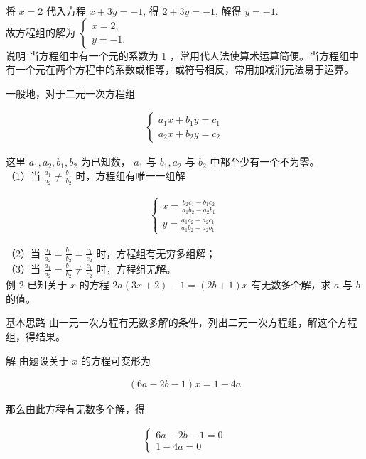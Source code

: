 \documentclass[10pt]{article}
\begin{document}
将 $x=2$ 代入方程 $x+3 y=-1$, 得 $2+3 y=-1$, 解得 $y=-1$.\\
故方程组的解为 $\left\{\begin{array}{l}x=2, \\ y=-1 .\end{array}\right.$\\
说明 当方程组中有一个元的系数为 1 ，常用代人法使算术运算简便。当方程组中有一个元在两个方程中的系数或相等，或符号相反，常用加减消元法易于运算。

一般地，对于二元一次方程组

\begin{align*}
\left\{\begin{array}{l}
a_{1} x+b_{1} y=c_{1} \\
a_{2} x+b_{2} y=c_{2}
\end{array}\right.
\end{align*}

这里 $a_{1}, a_{2}, b_{1}, b_{2}$ 为已知数， $a_{1}$ 与 $b_{1}, a_{2}$ 与 $b_{2}$ 中都至少有一个不为零。\\
（1）当 $\frac{a_{1}}{a_{2}} \neq \frac{b_{1}}{b_{2}}$ 时，方程组有唯一一组解

\begin{align*}
\left\{\begin{array}{l}
x=\frac{b_{2} c_{1}-b_{1} c_{2}}{a_{1} b_{2}-a_{2} b_{1}} \\
y=\frac{a_{1} c_{2}-a_{2} c_{1}}{a_{1} b_{2}-a_{2} b_{1}}
\end{array}\right.
\end{align*}

（2）当 $\frac{a_{1}}{a_{2}}=\frac{b_{1}}{b_{2}}=\frac{c_{1}}{c_{2}}$ 时，方程组有无穷多组解；\\
（3）当 $\frac{a_{1}}{a_{2}}=\frac{b_{1}}{b_{2}} \neq \frac{c_{1}}{c_{2}}$ 时，方程组无解。\\
例 2 已知关于 $x$ 的方程 $2 a(3 x+2)-1=(2 b+1) x$ 有无数多个解，求 $a$ 与 $b$ 的值。

基本思路 由一元一次方程有无数多解的条件，列出二元一次方程组，解这个方程组，得结果。

解 由题设关于 $x$ 的方程可变形为

\begin{align*}
(6 a-2 b-1) x=1-4 a
\end{align*}

那么由此方程有无数多个解，得

\begin{align*}
\left\{\begin{array}{l}
6 a-2 b-1=0 \\
1-4 a=0
\end{array}\right.
\end{align*}
\end{document}
